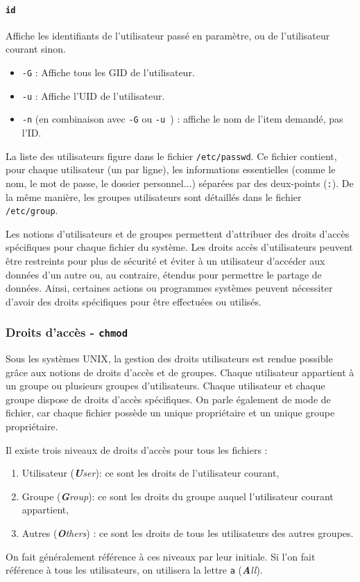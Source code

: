 \paragraph{\texttt{id}} 
Affiche les identifiants de l'utilisateur passé en paramètre, ou de l'utilisateur courant sinon.
\begin{itemize}
    \item \texttt{-G} : Affiche tous les GID de l'utilisateur.
    \item \texttt{-u} : Affiche l'UID de l'utilisateur.
    \item \texttt{-n} (en combinaison avec \texttt{-G} ou \texttt{-u }) : affiche le nom de l'item demandé, pas l'ID.
\end{itemize}\vspace{\baselineskip}

La liste des utilisateurs figure dans le fichier \texttt{/etc/passwd}. Ce fichier contient, pour chaque utilisateur (un par ligne), les informations essentielles (comme le nom, le mot de passe, le dossier personnel...) séparées par des deux-points (\texttt{:}). De la même manière, les groupes utilisateurs sont détaillés dans le fichier \texttt{/etc/group}.

Les notions d'utilisateurs et de groupes permettent d'attribuer des droits d'accès spécifiques pour chaque fichier du système. Les droits accès d'utilisateurs peuvent être restreints pour plus de sécurité et éviter à un utilisateur d'accéder aux données d'un autre ou, au contraire, étendus pour permettre le partage de données. Ainsi, certaines actions ou programmes systèmes peuvent nécessiter d'avoir des droits spécifiques pour être effectuées ou utilisés.

\subsubsection{Droits d'accès - \texttt{chmod}} \label{sec:chmod}
\vspace{-3mm}

Sous les systèmes UNIX, la gestion des droits utilisateurs est rendue possible grâce aux notions de droits d'accès et de groupes. Chaque utilisateur appartient à un groupe ou plusieurs groupes d'utilisateurs. Chaque utilisateur et chaque groupe dispose de droits d'accès spécifiques. On parle également de mode de fichier, car chaque fichier possède un unique propriétaire et un unique groupe propriétaire.

Il existe trois niveaux de droits d'accès pour tous les fichiers : 
\begin{enumerate}
    \item Utilisateur (\textit{\textbf{U}ser}): ce sont les droits de l'utilisateur courant,
    \item Groupe (\textit{\textbf{G}roup}): ce sont les droits du groupe auquel l'utilisateur courant appartient,
    \item Autres (\textit{\textbf{O}thers}) : ce sont les droits de tous les utilisateurs des autres groupes.
\end{enumerate}
On fait généralement référence à ces niveaux par leur initiale. Si l'on fait référence à tous les utilisateurs, on utilisera la lettre \texttt{a} (\textit{\textbf{A}ll}).

